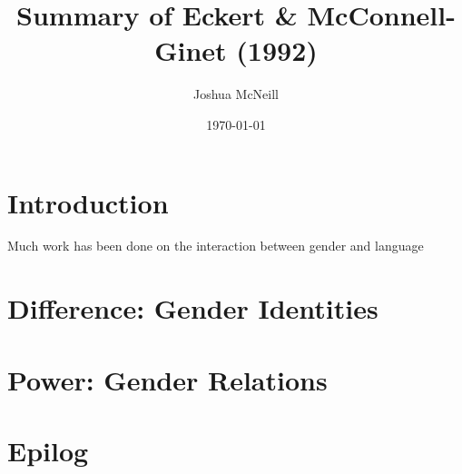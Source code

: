 \documentclass{article}
\title{Summary of Eckert \& McConnell-Ginet (1992)}
\author{Joshua McNeill}
\date{\today}
\begin{document}
  \maketitle
  \section{Introduction}
    Much work has been done on the interaction between gender and language
  \section{Difference: Gender Identities}
  \section{Power: Gender Relations}
  \section{Epilog}
\end{document}
